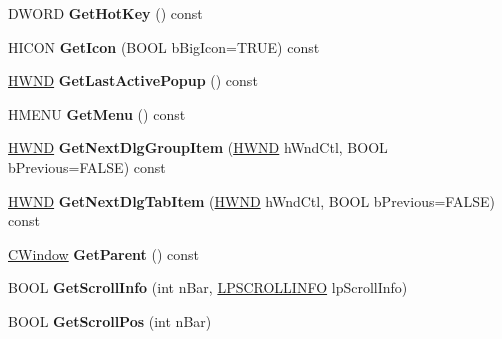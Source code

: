 \begin{DoxyCompactItemize}
\item 
\mbox{\label{class_a_t_l_1_1_c_window_aa7e70b8fbaaf80a7f5c354cc4e13b4e8}} 
D\+W\+O\+RD {\bfseries Get\+Hot\+Key} () const
\item 
\mbox{\label{class_a_t_l_1_1_c_window_abae3e3ac0657dcde29d07fe15a301a65}} 
H\+I\+C\+ON {\bfseries Get\+Icon} (B\+O\+OL b\+Big\+Icon=T\+R\+UE) const
\item 
\mbox{\label{class_a_t_l_1_1_c_window_a39452a52aa6f0e27faf4201e9c697f95}} 
\hyperlink{interfacevoid}{H\+W\+ND} {\bfseries Get\+Last\+Active\+Popup} () const
\item 
\mbox{\label{class_a_t_l_1_1_c_window_a6d134c5415df98fe53276ccc0e91bb15}} 
H\+M\+E\+NU {\bfseries Get\+Menu} () const
\item 
\mbox{\label{class_a_t_l_1_1_c_window_afa2138cc10ea3abdf4eae8c33c68ec3e}} 
\hyperlink{interfacevoid}{H\+W\+ND} {\bfseries Get\+Next\+Dlg\+Group\+Item} (\hyperlink{interfacevoid}{H\+W\+ND} h\+Wnd\+Ctl, B\+O\+OL b\+Previous=F\+A\+L\+SE) const
\item 
\mbox{\label{class_a_t_l_1_1_c_window_a318acd6b12960f0a6bf3bf7ffde09800}} 
\hyperlink{interfacevoid}{H\+W\+ND} {\bfseries Get\+Next\+Dlg\+Tab\+Item} (\hyperlink{interfacevoid}{H\+W\+ND} h\+Wnd\+Ctl, B\+O\+OL b\+Previous=F\+A\+L\+SE) const
\item 
\mbox{\label{class_a_t_l_1_1_c_window_a991d59cac416ab2d7e5ca7fdd22f7fda}} 
\hyperlink{class_a_t_l_1_1_c_window}{C\+Window} {\bfseries Get\+Parent} () const
\item 
\mbox{\label{class_a_t_l_1_1_c_window_afd79d8571adf43bbdcedd51ca129fba1}} 
B\+O\+OL {\bfseries Get\+Scroll\+Info} (int n\+Bar, \hyperlink{structtag_s_c_r_o_l_l_i_n_f_o}{L\+P\+S\+C\+R\+O\+L\+L\+I\+N\+FO} lp\+Scroll\+Info)
\item 
\mbox{\label{class_a_t_l_1_1_c_window_a923d77282e334c02cd335afa40781dc6}} 
B\+O\+OL {\bfseries Get\+Scroll\+Pos} (int n\+Bar)
\item 

\end{DoxyCompactItemize}
